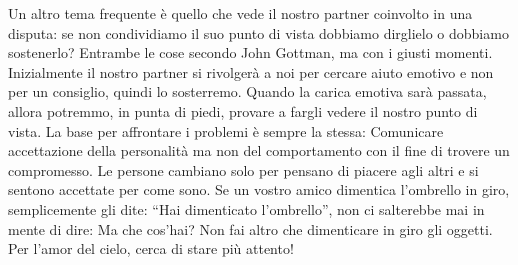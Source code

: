 \documentclass[12pt]{book} %
\begin{document}
Un altro tema frequente è quello che vede il nostro partner coinvolto in una disputa: se non condividiamo il suo punto
di vista dobbiamo dirglielo o dobbiamo sostenerlo? Entrambe le cose secondo John Gottman, ma con i giusti momenti.
Inizialmente il nostro partner si rivolgerà a noi per cercare aiuto emotivo e non per un consiglio, quindi lo
sosterremo. Quando la carica emotiva sarà passata, allora potremmo, in punta di piedi, provare a fargli vedere il
nostro punto di vista. La base per affrontare i problemi è sempre la stessa: Comunicare accettazione della personalità ma non del comportamento con il fine di trovere un compromesso.
Le persone cambiano solo per pensano di
piacere agli altri e si sentono accettate per come sono. Se un vostro amico dimentica l'ombrello
in giro, semplicemente gli dite: “Hai dimenticato l'ombrello”, non ci salterebbe mai in mente di
dire: Ma che cos'hai? Non fai altro che dimenticare in giro gli oggetti. Per
l'amor del cielo, cerca di stare più attento! 
\end{document}
